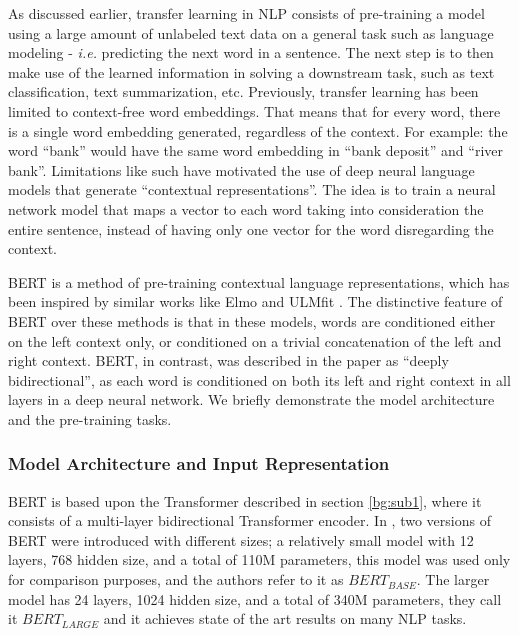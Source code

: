 As discussed earlier, transfer learning in \ac{NLP} consists of pre-training a model using a large amount of unlabeled text data on a general task such as language modeling - \textit{i.e.} predicting the next word in a sentence. The next step is to then make use of the learned information in solving a downstream task, such as text classification, text summarization, etc. Previously, transfer learning has been limited to context-free word embeddings. That means that for every word, there is a single word embedding generated, regardless of the context. For example: the word \enquote{bank} would have the same word embedding in \enquote{bank deposit} and \enquote{river bank}. Limitations like such have motivated the use of deep neural language models that generate \enquote{contextual representations}. The idea is to train a neural network model that maps a vector to each word taking into consideration the entire sentence, instead of having only one vector for the word disregarding the context.

\ac{BERT} \cite{devlin2018bert} is a method of pre-training contextual language representations, which has been inspired by similar works like Elmo \cite{Peters:2018} and ULMfit \cite{howard2018universal}. The distinctive feature of \ac{BERT} over these methods is that in these models, words are conditioned either on the left context only, or conditioned on a trivial concatenation of the left and right context. \ac{BERT}, in contrast, was described in the paper \cite{devlin2018bert} as \enquote{deeply bidirectional}, as each word is conditioned on both its left and right context in all layers in a deep neural network. We briefly demonstrate the model architecture and the pre-training tasks.

\subsubsection{Model Architecture and Input Representation}
\ac{BERT} is based upon the Transformer \cite{vaswani2017attention} described in section \ref{bg:sub1}, where it consists of a multi-layer bidirectional Transformer encoder. In \cite{devlin2018bert}, two versions of \ac{BERT} were introduced with different sizes; a relatively small model with 12 layers, 768 hidden size, and a total of 110M parameters, this model was used only for comparison purposes, and the authors refer to it as $BERT_{BASE}$. The larger model has 24 layers, 1024 hidden size, and a total of 340M parameters, they call it $BERT_{LARGE}$ and it achieves state of the art results on many \ac{NLP} tasks.


